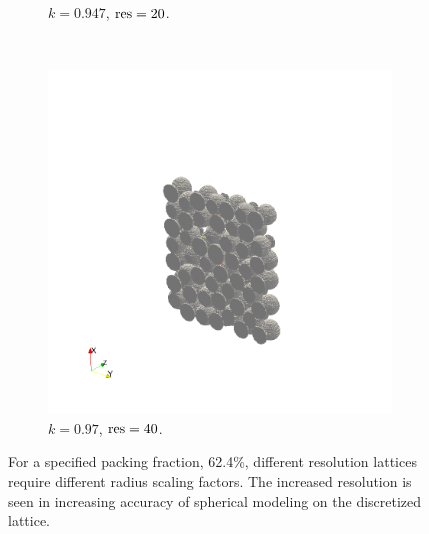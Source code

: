 \begin{figure}[ht]
\begin{subfigure}[b]{0.3\textwidth}
                \caption{$k = 0.947$, $\text{res} = 20$.}
                \label{fig:k0947res20}
        \end{subfigure}%
        ~
        \begin{subfigure}[b]{0.3\textwidth}
                \includegraphics[width=\textwidth, trim={200pt, 150pt, 200pt, 200pt},clip]{figures/lbm/k097res40}
                \caption{$k = 0.97$, $\text{res} = 40$.}
                \label{fig:k097res40}
        \end{subfigure}
        \caption{For a specified packing fraction, 62.4\%, different resolution lattices require different radius scaling factors. The increased resolution is seen in increasing accuracy of spherical modeling on the discretized lattice.}\label{fig:3d-dem-lbm-mapping}
\end{figure}

